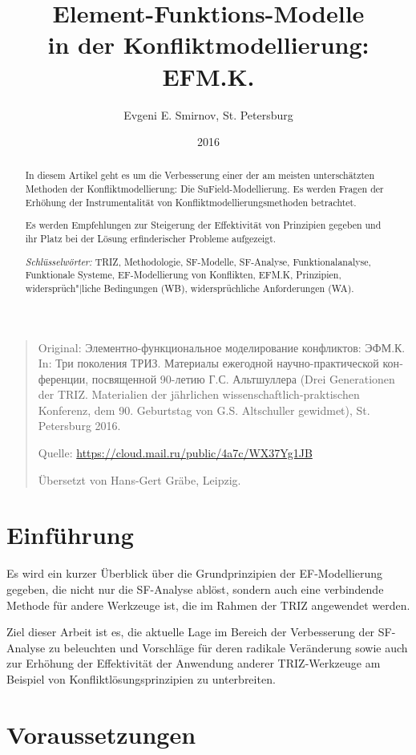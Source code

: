 \documentclass[11pt,a4paper]{article}
\title{Element-Funktions-Modelle\\ in der Konfliktmodellierung: EFM.K.}
\author{Evgeni E. Smirnov, St. Petersburg}
\date{2016}
\begin{document}
\maketitle
\begin{quote}
  Original: \foreignlanguage{russian}{Элементно-функциональное моделирование
    конфликтов: ЭФМ.К}. In: \foreignlanguage{russian}{Три поколения ТРИЗ.
    Материалы ежегодной научно-практической конференции, посвященной 90-летию
    Г.С. Альтшуллера} (Drei Generationen der TRIZ. Materialien der jährlichen
  wissenschaftlich-praktischen Konferenz, dem 90. Geburtstag von
  G.S. Altschuller gewidmet), St. Petersburg 2016.

  Quelle: \url{https://cloud.mail.ru/public/4a7c/WX37Yg1JB}
  
  Übersetzt von Hans-Gert Gräbe, Leipzig.
\end{quote}
\begin{abstract}
  In diesem Artikel geht es um die Verbesserung einer der am meisten
  unterschätzten Methoden der Konfliktmodellierung: Die SuField-Modellierung.
  Es werden Fragen der Erhöhung der Instrumentalität von
  Konfliktmodellierungsmethoden betrachtet.

  Es werden Empfehlungen zur Steigerung der Effektivität von Prinzipien
  gegeben und ihr Platz bei der Lösung erfinderischer Probleme aufgezeigt.

  \emph{Schlüsselwörter:} TRIZ, Methodologie, SF-Modelle, SF-Analyse,
  Funktionalanalyse, Funktionale Systeme, EF-Modellierung von Konflikten,
  EFM.K, Prinzipien, widersprüch"|liche Bedingungen (WB), widersprüchliche
  Anforderungen (WA).
\end{abstract}

\section*{Einführung}

Es wird ein kurzer Überblick über die Grundprinzipien der EF-Modellierung
gegeben, die nicht nur die SF-Analyse ablöst, sondern auch eine verbindende
Methode für andere Werkzeuge ist, die im Rahmen der TRIZ angewendet werden. 

Ziel dieser Arbeit ist es, die aktuelle Lage im Bereich der Verbesserung der
SF-Analyse zu beleuchten und Vorschläge für deren radikale Veränderung sowie
auch zur Erhöhung der Effektivität der Anwendung anderer TRIZ-Werkzeuge am
Beispiel von Konfliktlösungsprinzipien zu unterbreiten.

\section*{Voraussetzungen}
\end{document}
